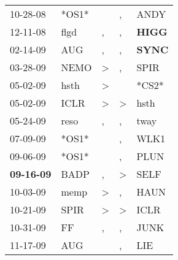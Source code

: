\begin{supertabular}{p{0.07\textwidth}p{0.06\textwidth}p{0.02\textwidth}p{0.02\textwidth}p{0.06\textwidth}}
          10-28-08\textsuperscript{} &                            *OS1* &                  &                , &           ANDY\textsuperscript{} \\
          12-11-08\textsuperscript{} &           flgd\textsuperscript{} &                , &                , &  \textbf{HIGG\textsuperscript{}} \\
          02-14-09\textsuperscript{} &            AUG\textsuperscript{} &                , &                , &  \textbf{SYNC\textsuperscript{}} \\
          03-28-09\textsuperscript{} &           NEMO\textsuperscript{} &     \textgreater &                , &           SPIR\textsuperscript{} \\
          05-02-09\textsuperscript{} &           hsth\textsuperscript{} &     \textgreater &                  &                            *CS2* \\
          05-02-09\textsuperscript{} &           ICLR\textsuperscript{} &     \textgreater &     \textgreater &           hsth\textsuperscript{} \\
          05-24-09\textsuperscript{} &           reso\textsuperscript{} &                , &                , &           tway\textsuperscript{} \\
          07-09-09\textsuperscript{} &                            *OS1* &                  &                , &           WLK1\textsuperscript{} \\
          09-06-09\textsuperscript{} &                            *OS1* &                  &                , &           PLUN\textsuperscript{} \\
 \textbf{09-16-09\textsuperscript{}} &           BADP\textsuperscript{} &                , &     \textgreater &           SELF\textsuperscript{} \\
          10-03-09\textsuperscript{} &           memp\textsuperscript{} &     \textgreater &                , &           HAUN\textsuperscript{} \\
          10-21-09\textsuperscript{} &           SPIR\textsuperscript{} &     \textgreater &     \textgreater &           ICLR\textsuperscript{} \\
          10-31-09\textsuperscript{} &             FF\textsuperscript{} &                , &                , &           JUNK\textsuperscript{} \\
          11-17-09\textsuperscript{} &            AUG\textsuperscript{} &                  &                , &            LIE\textsuperscript{} \\

\end{supertabular}
